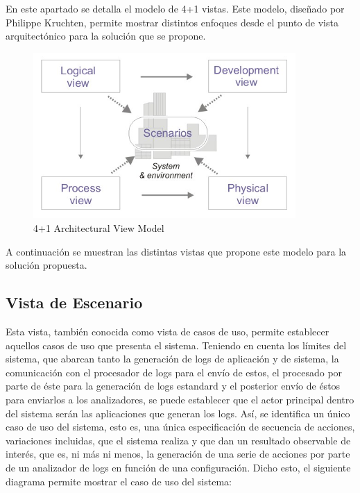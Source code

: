 \documentclass[11pt]{article}
\begin{document}
En este apartado se detalla el modelo de 4+1 vistas. Este modelo, diseñado por Philippe Kruchten, permite mostrar distintos enfoques desde el punto de vista arquitectónico para la solución que se propone.

\begin{center}
 \begin{figure}[H]
 \begin{center}
   \includegraphics[width=10cm]{img/4+1view.jpg}
   \caption{4+1 Architectural View Model}
   \label{fig:4plus1views}
 \end{center}
 \end{figure}
\end{center}

A continuación se muestran las distintas vistas que propone este modelo para la solución propuesta.

\subsection{Vista de Escenario}

Esta vista, también conocida como vista de casos de uso, permite establecer aquellos casos de uso que presenta el sistema.
Teniendo en cuenta los límites del sistema, que abarcan tanto la generación de logs de aplicación y de sistema, la comunicación con el procesador de logs para el envío de estos, el procesado por parte de éste para la generación de logs estandard y el posterior envío de éstos para enviarlos a los analizadores, se puede establecer que el actor principal dentro del sistema serán las aplicaciones que generan los logs.
Así, se identifica un único caso de uso del sistema, esto es, una única especificación de secuencia de acciones, variaciones incluidas, que el sistema realiza y que dan un resultado observable de interés, que es, ni más ni menos, la generación de una serie de acciones por parte de un analizador de logs en función de una configuración.
Dicho esto, el siguiente diagrama permite mostrar el caso de uso del sistema:
\end{document}
